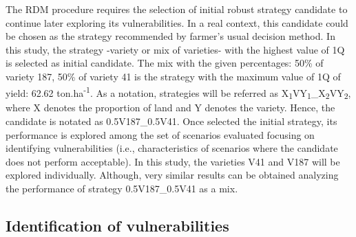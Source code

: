 \documentclass[syngen,nonblindrev]{informs3-syngen}
\begin{document}
The RDM procedure requires the selection of initial robust strategy candidate to continue later exploring its vulnerabilities. 
In a real context, this candidate could be chosen as the strategy recommended by farmer's usual decision method. 
In this study, the strategy -variety or mix of varieties- with the highest value of 1Q is selected as initial candidate. The mix with the given percentages: 50\% of variety 187, 50\% of variety 41 is the strategy with the maximum value of 1Q of yield: 62.62 ton.ha\textsuperscript{-1}.
As a notation, strategies will be referred as X\textsubscript{1}VY\textsubscript{1}\_X\textsubscript{2}VY\textsubscript{2}, where X denotes the proportion of land and Y denotes the variety. 
Hence, the candidate is notated as 0.5V187\_0.5V41. 
Once selected the initial strategy, its performance is explored among the set of scenarios evaluated focusing on identifying vulnerabilities (i.e., characteristics of scenarios where the candidate does not perform acceptable).
In this study, the varieties V41 and V187 will be explored individually. Although, very similar results can be obtained analyzing the performance of strategy 0.5V187\_0.5V41 as a mix. 

\subsection {Identification of vulnerabilities} 
\end{document}
